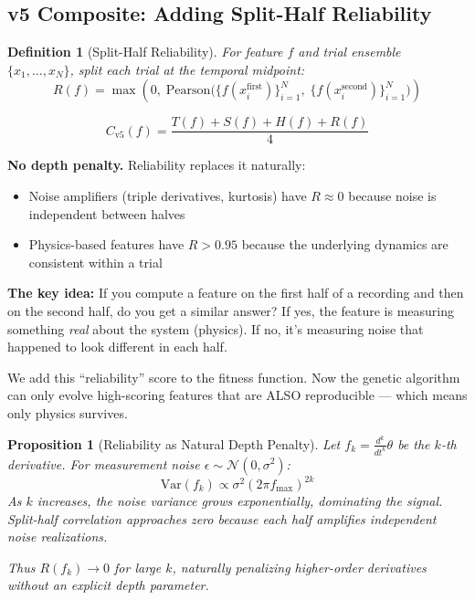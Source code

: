 \documentclass[11pt,a4paper]{article}
\newtheorem{definition}{Definition}
\newtheorem{proposition}{Proposition}
\begin{document}
\subsection{v5 Composite: Adding Split-Half Reliability}

\begin{definition}[Split-Half Reliability]
For feature $f$ and trial ensemble $\{x_1, \ldots, x_N\}$, split each trial
at the temporal midpoint:
\[
R(f) = \max\left(0, \;\text{Pearson}\Big(
\{f(x_i^{\text{first}})\}_{i=1}^N, \;
\{f(x_i^{\text{second}})\}_{i=1}^N
\Big)\right)
\]
\end{definition}

\begin{equation}
\boxed{C_{\text{v5}}(f) = \frac{T(f) + S(f) + H(f) + R(f)}{4}}
\label{eq:v5_composite}
\end{equation}

\textbf{No depth penalty.} Reliability replaces it naturally:
\begin{itemize}
    \item Noise amplifiers (triple derivatives, kurtosis) have $R \approx 0$
    because noise is independent between halves
    \item Physics-based features have $R > 0.95$ because the underlying
    dynamics are consistent within a trial
\end{itemize}

\begin{plainbox}
\textbf{The key idea:} If you compute a feature on the first half of a
recording and then on the second half, do you get a similar answer? If yes,
the feature is measuring something \emph{real} about the system (physics).
If no, it's measuring noise that happened to look different in each half.

We add this ``reliability'' score to the fitness function. Now the genetic
algorithm can only evolve high-scoring features that are ALSO reproducible ---
which means only physics survives.
\end{plainbox}

\begin{proposition}[Reliability as Natural Depth Penalty]
Let $f_k = \frac{d^k}{dt^k}\theta$ be the $k$-th derivative. For
measurement noise $\epsilon \sim \mathcal{N}(0, \sigma^2)$:
\[
\text{Var}(f_k) \propto \sigma^2 (2\pi f_{\max})^{2k}
\]
As $k$ increases, the noise variance grows exponentially, dominating the
signal. Split-half correlation approaches zero because each half amplifies
\emph{independent} noise realizations.

Thus $R(f_k) \to 0$ for large $k$, naturally penalizing higher-order
derivatives without an explicit depth parameter.
\end{proposition}
\end{document}
